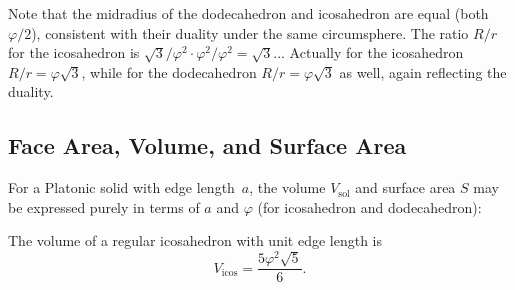 Note that the midradius of the dodecahedron and icosahedron are equal (both
$\varphi/2$), consistent with their duality under the same circumsphere.
The ratio $R/r$ for the icosahedron is $\sqrt{3}/\varphi^2 \cdot \varphi^2/\varphi^2 =
\sqrt{3}$... Actually for the icosahedron $R/r = \varphi\sqrt{3}$, while for
the dodecahedron $R/r = \varphi\sqrt{3}$ as well, again reflecting the
duality.

\subsection{Face Area, Volume, and Surface Area}
\label{sec:volumes}

For a Platonic solid with edge length~$a$, the volume $V_{\text{sol}}$ and
surface area $S$ may be expressed purely in terms of $a$ and $\varphi$
(for icosahedron and dodecahedron):

\begin{table}[ht]
\centering
\caption{Volume and surface area of the Platonic solids (edge length $a$).}
\label{tab:volumes}
\end{table}

\begin{proposition}
\label{prop:icosa-volume}
The volume of a regular icosahedron with unit edge length is
\[
  V_{\text{icos}} = \frac{5\varphi^2\sqrt{5}}{6}.
\]
\end{proposition}

